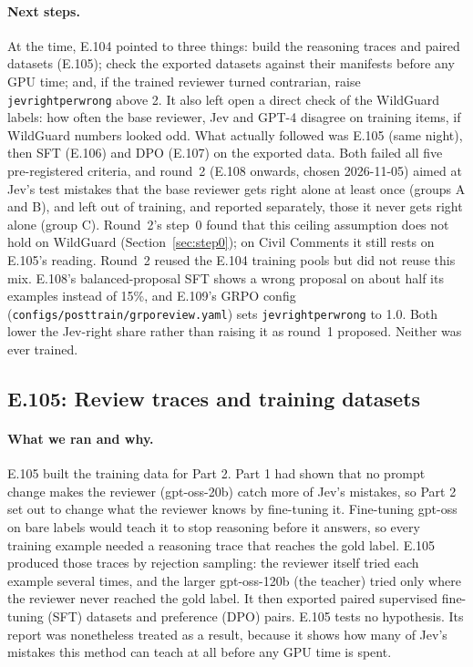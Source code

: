 \documentclass[11pt]{article}
\renewcommand{\_}{\origunderscore\allowbreak}
\begin{document}
\paragraph{Next steps.}
At the time, E.104 pointed to three things: build the reasoning traces and paired datasets (E.105); check the exported datasets against their manifests before any GPU time; and, if the trained reviewer turned contrarian, raise \texttt{jev\_right\_per\_wrong} above 2. It also left open a direct check of the WildGuard labels: how often the base reviewer, Jev and GPT-4 disagree on training items, if WildGuard numbers looked odd. What actually followed was E.105 (same night), then SFT (E.106) and DPO (E.107) on the exported data. Both failed all five pre-registered criteria, and round~2 (E.108 onwards, chosen 2026-11-05) aimed at Jev's test mistakes that the base reviewer gets right alone at least once (groups A and B), and left out of training, and reported separately, those it never gets right alone (group C). Round~2's step~0 found that this ceiling assumption does not hold on WildGuard (Section~\ref{sec:step0}); on Civil Comments it still rests on E.105's reading. Round~2 reused the E.104 training pools but did not reuse this mix. E.108's balanced-proposal SFT shows a wrong proposal on about half its examples instead of 15\%, and E.109's GRPO config (\texttt{configs/posttrain/grpo\_review.yaml}) sets \texttt{jev\_right\_per\_wrong} to 1.0. Both lower the Jev-right share rather than raising it as round~1 proposed. Neither was ever trained.

\subsection{E.105: Review traces and training datasets}\label{sec:e105}

\paragraph{What we ran and why.}
E.105 built the training data for Part 2. Part 1 had shown that no prompt change makes the reviewer (gpt-oss-20b) catch more of Jev's mistakes, so Part 2 set out to change what the reviewer knows by fine-tuning it. Fine-tuning gpt-oss on bare labels would teach it to stop reasoning before it answers, so every training example needed a reasoning trace that reaches the gold label. E.105 produced those traces by rejection sampling: the reviewer itself tried each example several times, and the larger gpt-oss-120b (the teacher) tried only where the reviewer never reached the gold label. It then exported paired supervised fine-tuning (SFT) datasets and preference (DPO) pairs. E.105 tests no hypothesis. Its report was nonetheless treated as a result, because it shows how many of Jev's mistakes this method can teach at all before any GPU time is spent.
\end{document}
